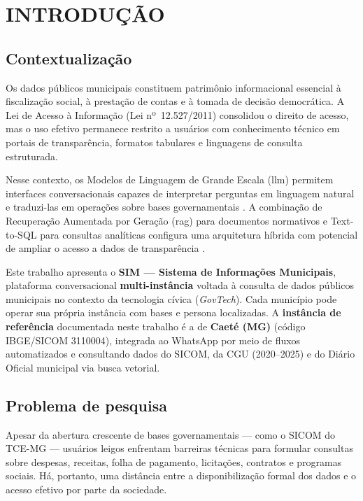 \chapter{\MakeUppercase{Introdução}}

\section{Contextualização}

Os dados públicos municipais constituem patrimônio informacional essencial à fiscalização social, à prestação de contas e à tomada de decisão democrática. A Lei de Acesso à Informação (Lei nº~12.527/2011) consolidou o direito de acesso, mas o uso efetivo permanece restrito a usuários com conhecimento técnico em portais de transparência, formatos tabulares e linguagens de consulta estruturada.

Nesse contexto, os Modelos de Linguagem de Grande Escala (\gls{llm}) permitem interfaces conversacionais capazes de interpretar perguntas em linguagem natural e traduzi-las em operações sobre bases governamentais \cite{Yu2018Spider,Li2024BIRD}. A combinação de Recuperação Aumentada por Geração (\gls{rag}) para documentos normativos e Text-to-SQL para consultas analíticas configura uma arquitetura híbrida com potencial de ampliar o acesso a dados de transparência \cite{Lewis2020RAG}.

Este trabalho apresenta o \textbf{SIM --- Sistema de Informações Municipais}, plataforma conversacional \textbf{multi-instância} voltada à consulta de dados públicos municipais no contexto da tecnologia cívica (\textit{GovTech}). Cada município pode operar sua própria instância com bases e persona localizadas. A \textbf{instância de referência} documentada neste trabalho é a de \textbf{Caeté (MG)} (código IBGE/SICOM 3110004), integrada ao WhatsApp por meio de fluxos automatizados e consultando dados do SICOM, da CGU (2020--2025) e do Diário Oficial municipal via busca vetorial.

\section{Problema de pesquisa}

Apesar da abertura crescente de bases governamentais --- como o SICOM do TCE-MG \cite{TCEMG_SICOM,Lei2024SICOM} --- usuários leigos enfrentam barreiras técnicas para formular consultas sobre despesas, receitas, folha de pagamento, licitações, contratos e programas sociais. Há, portanto, uma distância entre a disponibilização formal dos dados e o acesso efetivo por parte da sociedade.

